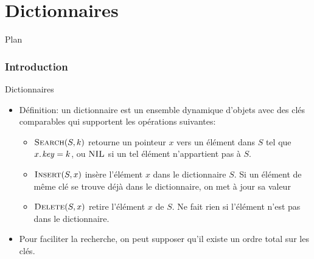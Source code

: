 
\part{Dictionnaires}






\begin{frame}{Plan}

\tableofcontents[hideallsubsections]

\end{frame}


\section{Introduction}

\begin{frame}{Dictionnaires}
\begin{itemize}
\item Définition: un \alert{dictionnaire} est un ensemble dynamique
  d'objets avec des clés comparables qui supportent les opérations
  suivantes:
\begin{itemize}
\item $\textnormal{\scshape Search}(S,k)$ retourne un pointeur $x$ vers un élément dans $S$ tel que $\attrib{x}{key}=k$, ou $\textnormal{\scshape NIL}$ si un tel élément n'appartient pas à $S$.
\medskip
\item $\textnormal{\scshape Insert}(S,x)$ insère l'élément $x$ dans le dictionnaire $S$. Si un élément de même clé se trouve déjà dans le dictionnaire, on met à jour sa valeur
\medskip
\item $\textnormal{\scshape Delete}(S,x)$ retire l'élément $x$ de $S$. Ne fait rien si l'élément n'est pas dans le dictionnaire.
\end{itemize}
\medskip
\item Pour faciliter la recherche, on peut supposer qu'il existe un ordre total sur les clés.
\end{itemize}
\end{frame}

